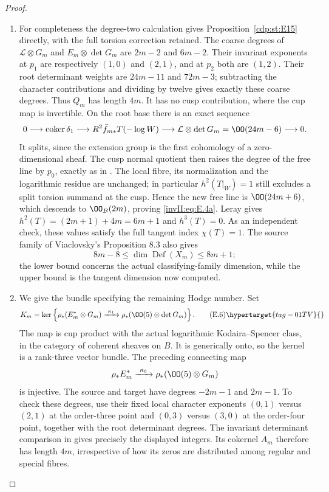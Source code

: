 \begin{proof}
\begin{enumerate}[label={$\langle1\rangle$\arabic*.},leftmargin=*]
\item For completeness the degree-two calculation gives Proposition~\ref{cdp:st:E15} directly,
with the full torsion correction retained. The coarse degrees of
$\mathcal L\otimes G_m$ and $E_m\otimes\det G_m$ are $2m-2$
and $6m-2$. Their invariant exponents at $p_1$ are respectively
$(1,0)$ and $(2,1)$, and at $p_2$ both are $(1,2)$.
Their root determinant weights are $24m-11$ and $72m-3$;
subtracting the character contributions and dividing by twelve
gives exactly these coarse degrees. Thus $Q_m$ has length $4m$.
It has no cusp contribution, where the cup map is invertible.
On the root base there is an exact sequence
\[
 0\longrightarrow\operatorname{coker}\delta_1
 \longrightarrow R^2\bar f_{m*}T(-\log W)
 \longrightarrow\mathcal L\otimes\det G_m
                 =\OO(24m-6)\longrightarrow0.
\]
It splits, since the extension group is the first cohomology of a
zero-dimensional sheaf. The cusp normal quotient then raises the
degree of the free line by $p_0$, exactly as in . The local
fibre, its normalization and the logarithmic residue are unchanged;
in particular $h^2(T|_W)=1$ still excludes a split torsion summand at
the cusp. Hence the new free line is $\OO(24m+6)$, which descends to
$\OO_B(2m)$, proving \eqref{invII:eq:E.4a}. Leray gives
$h^2(T)=(2m+1)+4m=6m+1$ and $h^3(T)=0$.
As an independent check, these values satisfy the full tangent
index $\chi(T)=1$. The source family of Viaclovsky's Proposition 8.3
also gives
\[
 8m-8\le\dim\operatorname{Def}(X_m)\le8m+1;
\]
the lower bound concerns the actual classifying-family dimension,
while the upper bound is the tangent dimension now computed.

\item We give the bundle specifying the remaining Hodge number. Set
\[
 K_m=\ker\left\{\rho_*(E_m^*\otimes G_m)
  \xrightarrow{\ \kappa_1\ }
       \rho_*(\OO(5)\otimes\det G_m)\right\}.         \tag{E.6}\hypertarget{tag-01TV}{}\label{invII:eq:E.6}
\]
The map is cup product with the actual logarithmic
Kodaira--Spencer class, in the category of coherent sheaves on $B$.
It is generically onto, so the kernel is a rank-three vector bundle.
The preceding connecting map
\[
 \rho_*E_m^*\xrightarrow{\ \kappa_0\ }
                 \rho_*(\OO(5)\otimes G_m)
\]
is injective. The source and target have degrees $-2m-1$ and
$2m-1$. To check these degrees, use their fixed local character
exponents $(0,1)$ versus $(2,1)$ at the order-three point and
$(0,3)$ versus $(3,0)$ at the order-four point, together with the
root determinant degrees. The invariant determinant comparison in
 gives precisely the displayed integers. Its cokernel $A_m$
therefore has length $4m$, irrespective of how its zeros are
distributed among regular and special fibres.


\end{enumerate}
\end{proof}
